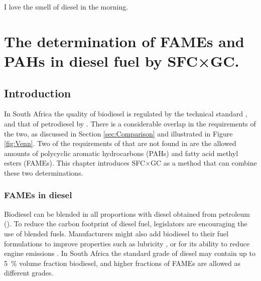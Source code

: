 
\begin{savequote}[\quotewidth]
I love the smell of diesel in the morning.
\end{savequote}

\chapter{The determination of FAMEs and PAHs in diesel fuel by SFC×GC.} %
\label{Chapter7} %

\section{Introduction}

In South Africa the quality of biodiesel is regulated by the technical standard
, and that of petrodiesel by . There is a
considerable overlap in the requirements of the two, as discussed in Section
\ref{sec:Comparison} and illustrated in Figure \ref{fig:Venn}. Two of the
requirements of  that are not found in  are the
allowed amounts of polycyclic aromatic hydrocarbons (PAHs) and fatty acid methyl
esters (FAMEs). This chapter  introduces SFC×GC as a method that can combine
these two determinations.

\subsection{FAMEs in diesel}

Biodiesel can be blended in all proportions with diesel obtained from petroleum
(). To reduce the carbon footprint of diesel fuel,
legislators are encouraging the use of blended fuels. Manufacturers might also
add biodiesel to their fuel formulations to improve properties such as lubricity
\autocite{Knothe2005}, or for its ability to reduce engine emissions
\autocite{Wattrus2016}. In South Africa the standard grade of diesel may contain
up to \SI{5}{\percent} volume fraction biodiesel, and higher fractions of FAMEs
are allowed as different grades.


